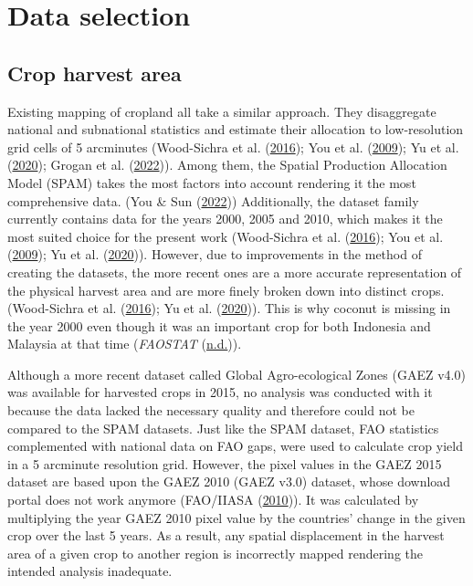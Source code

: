 \documentclass[
  letterpaper,
  DIV=11,
  numbers=noendperiod]{scrreprt}
\begin{document}
\hypertarget{data-selection}{%
\section{Data selection}\label{data-selection}}

\hypertarget{crop-harvest-area}{%
\subsection{Crop harvest area}\label{crop-harvest-area}}

Existing mapping of cropland all take a similar approach. They
disaggregate national and subnational statistics and estimate their
allocation to low-resolution grid cells of 5 arcminutes (Wood-Sichra et
al.
(\protect\hyperlink{ref-wood-sichraSpatialProductionAllocation2016}{2016});
You et al.
(\protect\hyperlink{ref-youGeneratingPlausibleCrop2009}{2009}); Yu et
al. (\protect\hyperlink{ref-yuCultivatedPlanet20102020}{2020}); Grogan
et al. (\protect\hyperlink{ref-groganGlobalGriddedCrop2022}{2022})).
Among them, the Spatial Production Allocation Model (SPAM) takes the
most factors into account rendering it the most comprehensive data. (You
\& Sun (\protect\hyperlink{ref-youMappingGlobalCropping2022}{2022}))
Additionally, the dataset family currently contains data for the years
2000, 2005 and 2010, which makes it the most suited choice for the
present work (Wood-Sichra et al.
(\protect\hyperlink{ref-wood-sichraSpatialProductionAllocation2016}{2016});
You et al.
(\protect\hyperlink{ref-youGeneratingPlausibleCrop2009}{2009}); Yu et
al. (\protect\hyperlink{ref-yuCultivatedPlanet20102020}{2020})).
However, due to improvements in the method of creating the datasets, the
more recent ones are a more accurate representation of the physical
harvest area and are more finely broken down into distinct crops.
(Wood-Sichra et al.
(\protect\hyperlink{ref-wood-sichraSpatialProductionAllocation2016}{2016});
Yu et al. (\protect\hyperlink{ref-yuCultivatedPlanet20102020}{2020})).
This is why coconut is missing in the year 2000 even though it was an
important crop for both Indonesia and Malaysia at that time
(\emph{{FAOSTAT}} (\protect\hyperlink{ref-FAOSTAT}{n.d.})).

Although a more recent dataset called Global Agro-ecological Zones (GAEZ
v4.0) was available for harvested crops in 2015, no analysis was
conducted with it because the data lacked the necessary quality and
therefore could not be compared to the SPAM datasets. Just like the SPAM
dataset, FAO statistics complemented with national data on FAO gaps,
were used to calculate crop yield in a 5 arcminute resolution grid.
However, the pixel values in the GAEZ 2015 dataset are based upon the
GAEZ 2010 (GAEZ v3.0) dataset, whose download portal does not work
anymore (FAO/IIASA
(\protect\hyperlink{ref-faoux2fiiasaGlobalAgroecologicalZones2010}{2010})).
It was calculated by multiplying the year GAEZ 2010 pixel value by the
countries' change in the given crop over the last 5 years. As a result,
any spatial displacement in the harvest area of a given crop to another
region is incorrectly mapped rendering the intended analysis inadequate.
\end{document}
